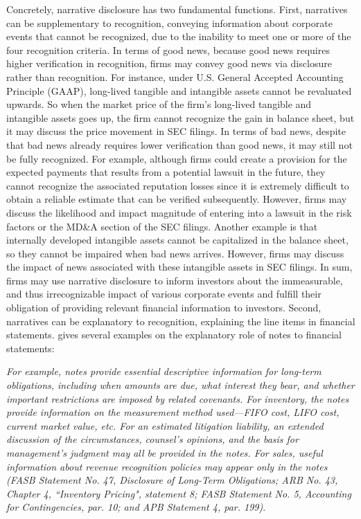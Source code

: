 \documentclass[a4paper]{article}
\begin{document}
\begin{spacing}{2}
Concretely, narrative disclosure has two fundamental functions. First, narratives can be supplementary to recognition, conveying information about corporate events that cannot be recognized, due to the inability to meet one or more of the four recognition criteria. In terms of good news, because good news requires higher verification in recognition, firms may convey good news via disclosure rather than recognition. For instance, under U.S. General Accepted Accounting Principle (GAAP), long-lived tangible and intangible assets cannot be revaluated upwards. So when the market price of the firm's long-lived tangible and intangible assets goes up, the firm cannot recognize the gain in balance sheet, but it may discuss the price movement in SEC filings. In terms of bad news, despite that bad news already requires lower verification than good news, it may still not be fully recognized. For example, although firms could create a provision for the expected payments that results from a potential lawsuit in the future, they cannot recognize the associated reputation losses since it is extremely difficult to obtain a reliable estimate that can be verified subsequently. However, firms may discuss the likelihood and impact magnitude of entering into a lawsuit in the risk factors or the MD\&A section of the SEC filings. Another example is that internally developed intangible assets cannot be capitalized in the balance sheet, so they cannot be impaired when bad news arrives. However, firms may discuss the impact of news associated with these intangible assets in SEC filings. In sum, firms may use narrative disclosure to inform investors about the immeasurable, and thus irrecognizable impact of various corporate events and fulfill their obligation of providing relevant financial information to investors. Second, narratives can be explanatory to recognition, explaining the line items in financial statements.  gives several examples on the explanatory role of notes to financial statements:

\begin{singlespace}
	\indent \textit{For example, notes provide essential descriptive information for long-term obligations, including when amounts are due, what interest they bear, and whether important restrictions are imposed by related covenants. For inventory, the notes provide information on the measurement method used---FIFO cost, LIFO cost, current market value, etc. For an estimated litigation liability, an extended discussion of the circumstances, counsel's opinions, and the basis for management's judgment may all be provided in the notes. For sales, useful information about revenue recognition policies may appear only in the notes (FASB Statement No. 47, Disclosure of Long-Term Obligations; ARB No. 43, Chapter 4, ``Inventory Pricing", statement 8; FASB Statement No. 5, Accounting for Contingencies, par. 10; and APB Statement 4, par. 199)}.
\end{singlespace}


\end{spacing}
\end{document}
